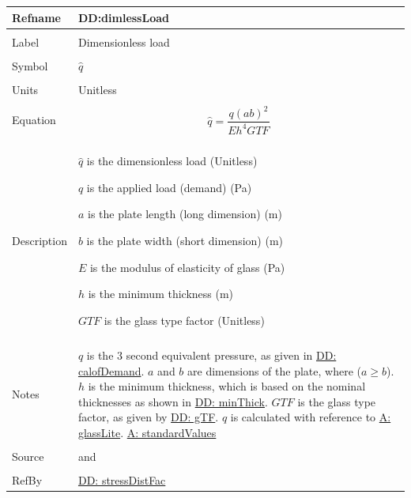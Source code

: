 \documentclass[12pt]{article}
\begin{document}
\noindent \begin{minipage}{\textwidth}
\begin{tabular}{p{} p{}}
\toprule \textbf{Refname} & \textbf{DD:dimlessLoad}
\label{DD:dimlessLoad}
\\ \midrule \\
Label & Dimensionless load
\\ \midrule \\
Symbol & $\hat{q}$
\\ \midrule \\
Units & Unitless
\\ \midrule \\
Equation & \begin{displaymath}
           \hat{q}=\frac{q \left(a b\right)^{2}}{E h^{4} GTF}
           \end{displaymath}
\\ \midrule \\
Description & \begin{symbDescription}
              \item{$\hat{q}$ is the dimensionless load (Unitless)}
              \item{$q$ is the applied load (demand) (Pa)}
              \item{$a$ is the plate length (long dimension) (m)}
              \item{$b$ is the plate width (short dimension) (m)}
              \item{$E$ is the modulus of elasticity of glass (Pa)}
              \item{$h$ is the minimum thickness (m)}
              \item{$GTF$ is the glass type factor (Unitless)}
              \end{symbDescription}
\\ \midrule \\
Notes & $q$ is the 3 second equivalent pressure, as given in \hyperref[DD:calofDemand]{DD: calofDemand}.
        $a$ and $b$ are dimensions of the plate, where ($a\geq{}b$).
        $h$ is the minimum thickness, which is based on the nominal thicknesses as shown in \hyperref[DD:minThick]{DD: minThick}.
        $GTF$ is the glass type factor, as given by \hyperref[DD:gTF]{DD: gTF}.
        $\hat{q}$ is calculated with reference to \hyperref[assumpGL]{A: glassLite}.
        \hyperref[assumpSV]{A: standardValues}
\\ \midrule \\
Source & \cite{astm2009} and \cite[(Eq. 7)]{campidelli}
\\ \midrule \\
RefBy & \hyperref[DD:stressDistFac]{DD: stressDistFac}
\\ \bottomrule \end{tabular}
\end{minipage}
\par~
\end{document}
